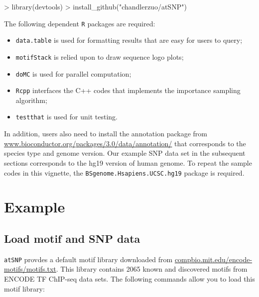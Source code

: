 \documentclass[a4paper,10pt]{article}
\begin{document}
\begin{Schunk}
\begin{Sinput}
> library(devtools)
> install_github("chandlerzuo/atSNP")
\end{Sinput}
\end{Schunk}

The following dependent \texttt{R} packages are required:

\begin{itemize}
\item \texttt{data.table} is used for formatting results that are easy for users to query;
\item \texttt{motifStack} is relied upon to draw sequence logo plots;
\item \texttt{doMC} is used for parallel computation;
\item \texttt{Rcpp} interfaces the C++ codes that implements the importance sampling algorithm;
\item \texttt{testthat} is used for unit testing.
\end{itemize}
  
In addition, users also need to install the annotation package from \url{www.bioconductor.org/packages/3.0/data/annotation/} that corresponds to the species type and genome version. Our example SNP data set in the subsequent sections corresponds to the hg19 version of human genome. To repeat the sample codes in this vignette, the \texttt{BSgenome.Hsapiens.UCSC.hg19} package is required.

\section{Example}

\subsection{Load motif and SNP data}

\texttt{atSNP} provdes a default motif library downloaded from \url{compbio.mit.edu/encode-motifs/motifs.txt}. This library contains 2065 known and discovered motifs from ENCODE TF ChIP-seq data sets. The following commands allow you to load this motif library:
\end{document}
